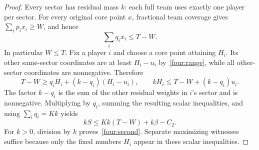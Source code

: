 \begin{proof}
Every sector has residual mass $k$: each full team uses exactly one
player per sector. For every original core point $x$, fractional team
coverage gives $\sum_i p_ix_i\ge W$, and hence
\begin{equation}\label{four:residual}
                   \sum_iq_ix_i\le T-W.
\end{equation}
In particular $W\le T$. Fix a player $i$ and choose a core point
attaining $H_i$. Its other same-sector coordinates are at least
$H_i-u_i$ by~\eqref{four:range}, while all other-sector coordinates
are nonnegative. Therefore
\[
        T-W\ge q_iH_i+(k-q_i)(H_i-u_i),
        \qquad
        kH_i\le T-W+(k-q_i)u_i.
\]
The factor $k-q_i$ is the sum of the other residual weights in $i$'s
sector and is nonnegative. Multiplying by $q_i$, summing the resulting
scalar inequalities, and using $\sum_iq_i=Kk$ yields
\[
                    kS\le Kk(T-W)+k\beta-C_2.
\]
For $k>0$, division by $k$ proves~\eqref{four:second}. Separate
maximizing witnesses suffice because only the fixed numbers $H_i$
appear in these scalar inequalities.
\end{proof}

